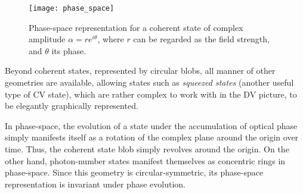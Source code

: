 \begin{figure}[!htbp]
\texttt{[image: phase\_space]}
\captionspacefig \caption{Phase-space representation for a coherent state of complex amplitude \mbox{$\alpha=re^{i\theta}$}, where $r$ can be regarded as the field strength, and $\theta$ its phase.}\label{fig:phase_space}
\end{figure}

Beyond coherent states, represented by circular blobs, all manner of other geometries are available, allowing states such as \textit{squeezed states} (another useful type of CV state), which are rather complex to work with in the DV picture, to be elegantly graphically represented.

In phase-space, the evolution of a state under the accumulation of optical phase simply manifests itself as a rotation of the complex plane around the origin over time. Thus, the coherent state blob simply revolves around the origin. On the other hand, photon-number states manifest themselves as concentric rings in phase-space. Since this geometry is circular-symmetric, its phase-space representation is invariant under phase evolution.